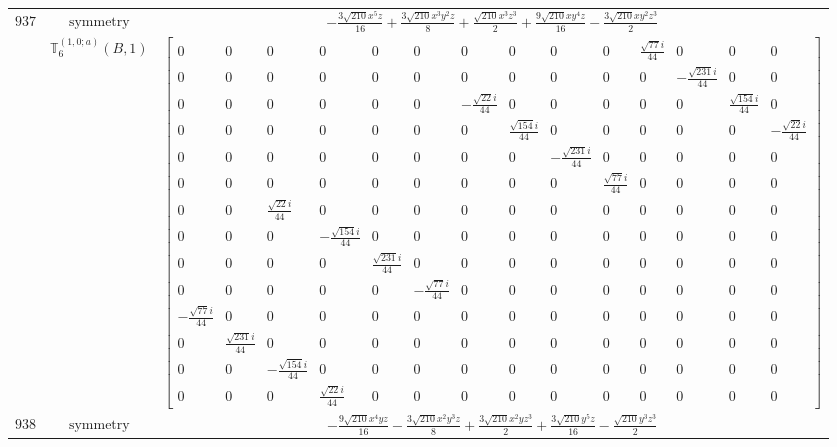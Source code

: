 \documentclass[fleqn,8pt,landscape]{jsarticle}
\begin{document}
\begin{longtable}{ccc}
$ 937 $ & $ \text{symmetry} $ & $ - \frac{3 \sqrt{210} x^{5} z}{16} + \frac{3 \sqrt{210} x^{3} y^{2} z}{8} + \frac{\sqrt{210} x^{3} z^{3}}{2} + \frac{9 \sqrt{210} x y^{4} z}{16} - \frac{3 \sqrt{210} x y^{2} z^{3}}{2} $ \\
$  $ & $ \mathbb{T}_{6}^{(1,0;a)}(B,1) $ & $ \begin{bmatrix} 0 & 0 & 0 & 0 & 0 & 0 & 0 & 0 & 0 & 0 & \frac{\sqrt{77} i}{44} & 0 & 0 & 0 \\ 0 & 0 & 0 & 0 & 0 & 0 & 0 & 0 & 0 & 0 & 0 & - \frac{\sqrt{231} i}{44} & 0 & 0 \\ 0 & 0 & 0 & 0 & 0 & 0 & - \frac{\sqrt{22} i}{44} & 0 & 0 & 0 & 0 & 0 & \frac{\sqrt{154} i}{44} & 0 \\ 0 & 0 & 0 & 0 & 0 & 0 & 0 & \frac{\sqrt{154} i}{44} & 0 & 0 & 0 & 0 & 0 & - \frac{\sqrt{22} i}{44} \\ 0 & 0 & 0 & 0 & 0 & 0 & 0 & 0 & - \frac{\sqrt{231} i}{44} & 0 & 0 & 0 & 0 & 0 \\ 0 & 0 & 0 & 0 & 0 & 0 & 0 & 0 & 0 & \frac{\sqrt{77} i}{44} & 0 & 0 & 0 & 0 \\ 0 & 0 & \frac{\sqrt{22} i}{44} & 0 & 0 & 0 & 0 & 0 & 0 & 0 & 0 & 0 & 0 & 0 \\ 0 & 0 & 0 & - \frac{\sqrt{154} i}{44} & 0 & 0 & 0 & 0 & 0 & 0 & 0 & 0 & 0 & 0 \\ 0 & 0 & 0 & 0 & \frac{\sqrt{231} i}{44} & 0 & 0 & 0 & 0 & 0 & 0 & 0 & 0 & 0 \\ 0 & 0 & 0 & 0 & 0 & - \frac{\sqrt{77} i}{44} & 0 & 0 & 0 & 0 & 0 & 0 & 0 & 0 \\ - \frac{\sqrt{77} i}{44} & 0 & 0 & 0 & 0 & 0 & 0 & 0 & 0 & 0 & 0 & 0 & 0 & 0 \\ 0 & \frac{\sqrt{231} i}{44} & 0 & 0 & 0 & 0 & 0 & 0 & 0 & 0 & 0 & 0 & 0 & 0 \\ 0 & 0 & - \frac{\sqrt{154} i}{44} & 0 & 0 & 0 & 0 & 0 & 0 & 0 & 0 & 0 & 0 & 0 \\ 0 & 0 & 0 & \frac{\sqrt{22} i}{44} & 0 & 0 & 0 & 0 & 0 & 0 & 0 & 0 & 0 & 0 \end{bmatrix} $ \\ \hline
$ 938 $ & $ \text{symmetry} $ & $ - \frac{9 \sqrt{210} x^{4} y z}{16} - \frac{3 \sqrt{210} x^{2} y^{3} z}{8} + \frac{3 \sqrt{210} x^{2} y z^{3}}{2} + \frac{3 \sqrt{210} y^{5} z}{16} - \frac{\sqrt{210} y^{3} z^{3}}{2} $ \\

\end{longtable}
\end{document}
